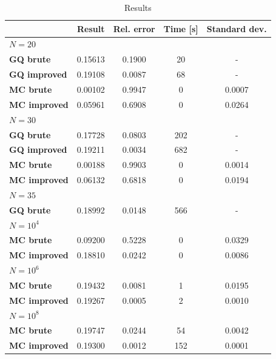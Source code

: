 \documentclass[norsk,a4paper,11pt]{article}
\begin{document}
\begin{table}
  \begin{center}
  \caption{
      \label{tab:r1}
  Results}
  \begin{tabular}{|l|c|c|c|c|} \hline
      & \textbf{Result} & \textbf{Rel. error} & \textbf{Time [s]} & \textbf{Standard dev.}\\ \hline
      \textbf{$N=20$}      &  & &  & \\
      \textbf{GQ brute}   &0.15613 & 0.1900 & 20 & - \\
      \textbf{GQ improved}&0.19108 & 0.0087 & 68 & - \\
      \textbf{MC brute}   &0.00102 & 0.9947 &  0 & 0.0007 \\
      \textbf{MC improved}&0.05961 & 0.6908 &  0 & 0.0264 \\
      \textbf{$N=30$}      &  & &  & \\
      \textbf{GQ brute}   &0.17728 & 0.0803 &202 & -  \\
      \textbf{GQ improved}&0.19211 & 0.0034 &682 & -  \\
      \textbf{MC brute}   &0.00188 & 0.9903 & 0  & 0.0014 \\
      \textbf{MC improved}&0.06132 & 0.6818 & 0  & 0.0194 \\
      \textbf{$N=35$}      &  & &  & \\
      \textbf{GQ brute}   &0.18992 & 0.0148 &566 & - \\
      \textbf{$N=10^4$}      &  & &  & \\
      \textbf{MC brute}   &0.09200 & 0.5228 &  0 & 0.0329 \\
      \textbf{MC improved}&0.18810 & 0.0242 &  0 & 0.0086 \\
      \textbf{$N=10^6$}   &  & &  & \\
      \textbf{MC brute}   &0.19432 & 0.0081 &  1 & 0.0195 \\
      \textbf{MC improved}&0.19267 & 0.0005 &  2 & 0.0010 \\
      \textbf{$N=10^8$}      &  & &  & \\
      \textbf{MC brute}   &0.19747 & 0.0244 & 54 & 0.0042 \\
      \textbf{MC improved}&0.19300 & 0.0012 &152 & 0.0001 \\  \hline
  \end{tabular}
  \end{center}
\end{table}
\end{document}
